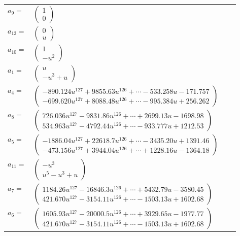 \documentclass[1p]{elsarticle_modified}
\theoremstyle{definition}
\begin{document}
\begin{tabular}{m{7pt} m{180pt} m{7pt} m{180pt} }
\flushright $a_{9}=$&$\begin{pmatrix}1\\0\end{pmatrix}$ \\
\flushright $a_{12}=$&$\begin{pmatrix}0\\u\end{pmatrix}$ \\
\flushright $a_{10}=$&$\begin{pmatrix}1\\- u^2\end{pmatrix}$ \\
\flushright $a_{1}=$&$\begin{pmatrix}u\\- u^3+u\end{pmatrix}$ \\
\flushright $a_{4}=$&$\begin{pmatrix}-890.124 u^{127}+9855.63 u^{126}+\cdots-533.258 u-171.757\\-699.620 u^{127}+8088.48 u^{126}+\cdots-995.384 u+256.262\end{pmatrix}$ \\
\flushright $a_{8}=$&$\begin{pmatrix}726.036 u^{127}-9831.86 u^{126}+\cdots+2699.13 u-1698.98\\534.963 u^{127}-4792.44 u^{126}+\cdots-933.777 u+1212.53\end{pmatrix}$ \\
\flushright $a_{5}=$&$\begin{pmatrix}-1886.04 u^{127}+22618.7 u^{126}+\cdots-3435.20 u+1391.46\\-473.156 u^{127}+3944.04 u^{126}+\cdots+1228.16 u-1364.18\end{pmatrix}$ \\
\flushright $a_{11}=$&$\begin{pmatrix}- u^3\\u^5- u^3+u\end{pmatrix}$ \\
\flushright $a_{7}=$&$\begin{pmatrix}1184.26 u^{127}-16846.3 u^{126}+\cdots+5432.79 u-3580.45\\421.670 u^{127}-3154.11 u^{126}+\cdots-1503.13 u+1602.68\end{pmatrix}$ \\
\flushright $a_{6}=$&$\begin{pmatrix}1605.93 u^{127}-20000.5 u^{126}+\cdots+3929.65 u-1977.77\\421.670 u^{127}-3154.11 u^{126}+\cdots-1503.13 u+1602.68\end{pmatrix}$ \\

\end{tabular}
\end{document}
